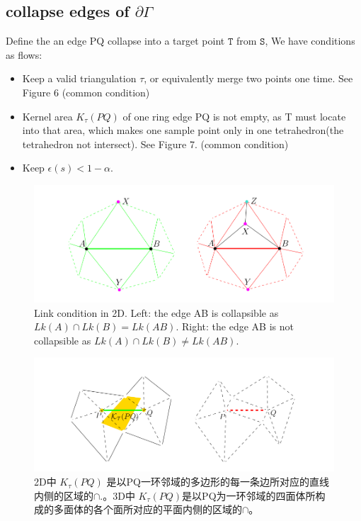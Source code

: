 \documentclass{article}
\theoremstyle{definition}
\theoremstyle{remark}
\begin{document}
\subsection{collapse edges of $\partial \Gamma$}
Define the an edge PQ collapse into a target point $\mathtt{T}$ from $\mathtt{S}$, We have conditions as flows:
\begin{itemize}
  \item Keep a valid triangulation $\tau$, or equivalently merge two points one time. See Figure 6  (common condition)
  \item Kernel area $K_{\tau}(PQ)$ of one ring edge PQ is not empty, as T must locate into that area, which makes one sample point only in one tetrahedron(the tetrahedron not intersect). See Figure 7. (common condition)
  \item Keep $\epsilon(s) < 1-\alpha$.
\end{itemize}
\begin{figure}[H]
 	\includegraphics[width=12cm]{6}
	\caption[Link condition in 2D]
        {Link condition in 2D. Left: the edge AB is collapsible as
$Lk(A) \cap Lk(B) = Lk(AB)$. Right: the edge AB is not collapsible as $Lk(A) \cap Lk(B) \ne Lk(AB)$.}
 	\centering
\end{figure}
\begin{figure}[H]
 	\includegraphics[width=12cm]{7}
	\caption[Kernel area]
        {2D中 $K_{\tau}(PQ)$ 是以PQ一环邻域的多边形的每一条边所对应的直线内侧的区域的$\cap$.。3D中 $K_{\tau}(PQ)$是以PQ为一环邻域的四面体所构成的多面体的各个面所对应的平面内侧的区域的$\cap$。}
 	\centering
\end{figure}
\end{document}
